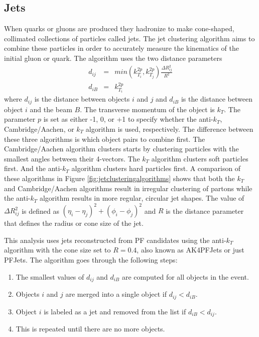 \subsection{Jets}
When quarks or gluons are produced they hadronize to make cone-shaped, collimated collections of particles called jets.  The jet clustering algorithm aims to combine these particles in order to accurately measure the kinematics of the initial gluon or quark.  The algorithm uses the two distance parameters
\begin{eqnarray}
	d_{ij} &=& min(k_{T_i}^{2p},k_{T_j}^{2p})\frac{\Delta R_{ij}^2}{R^2} \\
	d_{iB} &=& k_{T_i}^{2p}
\end{eqnarray}
where $d_{ij}$ is the distance between objects $i$ and $j$ and $d_{iB}$ is the distance between object $i$ and the beam $B$.  The transverse momentum of the object is $k_T$.  The parameter $p$ is set as either -1, 0, or +1 to specify whether the anti-$k_T$, Cambridge/Aachen, or $k_T$ algorithm is used, respectively.  The difference between these three algorithms is which object pairs to combine first.  The Cambridge/Aachen algorithm clusters starts by clustering particles with the smallest angles between their 4-vectors.  The $k_T$ algorithm clusters soft particles first.  And the anti-$k_T$ algorithm clusters hard particles first. A comparison of these algorithms in Figure \ref{fig:jetclusteringalgorithms} shows that both the $k_T$ and Cambridge/Aachen algorithms result in irregular clustering of partons while the anti-$k_T$ algorithm results in more regular, circular jet shapes.  The value of $\Delta R_{ij}^2$ is defined as $(\eta_i-\eta_j)^2+(\phi_i-\phi_j)^2$ and $R$ is the distance parameter that defines the radius or cone size of the jet.

This analysis uses jets reconstructed from PF candidates using the anti-$k_T$ algorithm with the cone size set to $R= 0.4$, also known as AK4PFJets or just PFJets. The algorithm goes through the following steps:
\begin{enumerate}
	\item The smallest values of $d_{ij}$ and $d_{iB}$ are computed for all objects in the event.
	\item Objects $i$ and $j$ are merged into a single object if $d_{ij}<d_{iB}$.  
	\item Object $i$ is labeled as a jet and removed from the list if $d_{iB}<d_{ij}$. 
	\item This is repeated until there are no more objects.
\end{enumerate}


